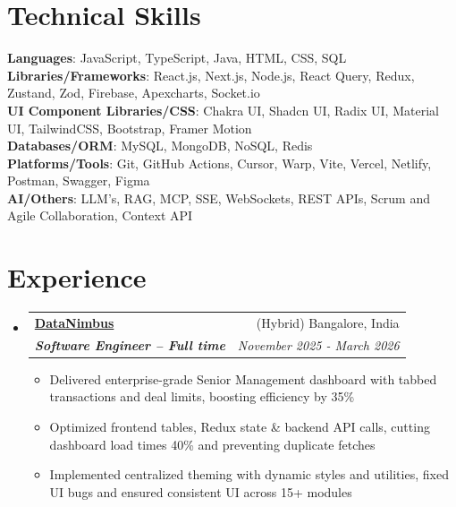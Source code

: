 \documentclass[letterpaper,10pt]{article}
\makeatletter
\newcommand{\resumeItem}[1]{
    \item\small{
      {#1 \vspace{-1pt}}
    }
  }
\newcommand{\resumeSubheading}[4]{
  \item
    \begin{tabular*}{0.97\textwidth}[t]{l@{\extracolsep{\fill}}r}
      {#1} & #2 \\
      \textit{\small#3} & \textit{\small #4} \\
    \end{tabular*}\vspace{-5pt}
}
\newcommand{\resumeSubHeadingListStart}{\begin{itemize}[leftmargin=0.15in, label={}]}
\newcommand{\resumeSubHeadingListEnd}{\end{itemize}}
\newcommand{\resumeItemListStart}{\begin{itemize}}
\newcommand{\resumeItemListEnd}{\end{itemize}}
\makeatother
\begin{document}
\section{Technical Skills}
\begin{itemize}[leftmargin=0.15in, label={}]
  \small{\item{
        \textbf{Languages}{: \hfill JavaScript, TypeScript, Java, HTML, CSS, SQL \hfill} \\
        \vspace{3pt}\textbf{Libraries/Frameworks}{: \hfill React.js, Next.js, Node.js, React Query, Redux, Zustand, Zod, Firebase, Apexcharts, Socket.io \hfill} \\
        \vspace{3pt}\textbf{UI Component Libraries/CSS}{: \hfill Chakra UI, Shadcn UI, Radix UI, Material UI, TailwindCSS, Bootstrap, Framer Motion \hfill} \\
        \vspace{3pt}\textbf{Databases/ORM}{: \hfill MySQL, MongoDB, NoSQL, Redis \hfill} \\
        \vspace{3pt}\textbf{Platforms/Tools}{: \hfill Git,  GitHub Actions, Cursor, Warp, Vite, Vercel, Netlify, Postman, Swagger, Figma \hfill} \\
        \vspace{3pt}\textbf{AI/Others}{: \hfill LLM's, RAG, MCP, SSE, WebSockets, REST APIs, Scrum and Agile Collaboration, Context API \hfill} \\
        }}
\end{itemize}



\section{Experience}

\resumeSubHeadingListStart
\resumeSubheading
{\textbf{\href{https://datanimbus.com}{DataNimbus}\hspace{5pt}}{{}}}{(Hybrid) Bangalore, India}
{\textbf{Software Engineer – Full time}}{November 2025 - March 2026}
\resumeItemListStart
\resumeItem{Delivered enterprise-grade Senior Management dashboard with tabbed transactions and deal limits, boosting efficiency by 35\%
}
\resumeItem{Optimized frontend tables, Redux state \& backend API calls, cutting dashboard load times 40\% and preventing duplicate fetches
}
\resumeItem{Implemented centralized theming with dynamic styles and utilities, fixed UI bugs and ensured consistent UI across 15+ modules
}
\resumeItemListEnd
\resumeSubHeadingListEnd
\end{document}
